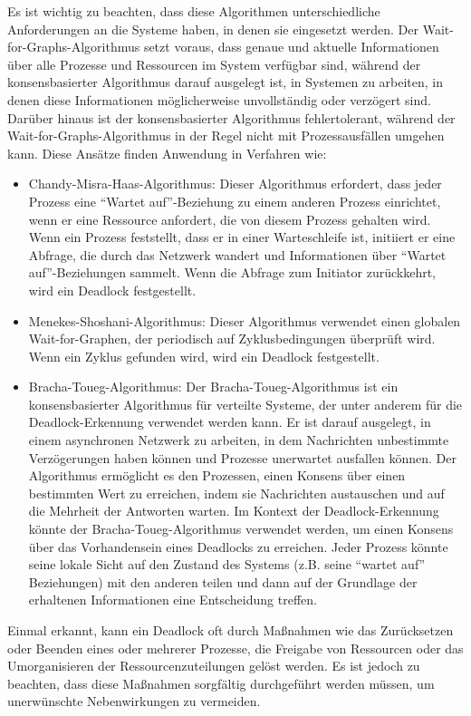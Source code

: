 Es ist wichtig zu beachten, dass diese Algorithmen unterschiedliche Anforderungen an die Systeme haben, in denen sie eingesetzt werden. Der Wait-for-Graphs-Algorithmus setzt voraus, dass genaue und aktuelle Informationen über alle Prozesse und Ressourcen im System verfügbar sind, während der konsensbasierter Algorithmus darauf ausgelegt ist, in Systemen zu arbeiten, in denen diese Informationen möglicherweise unvollständig oder verzögert sind. Darüber hinaus ist der konsensbasierter Algorithmus fehlertolerant, während der Wait-for-Graphs-Algorithmus in der Regel nicht mit Prozessausfällen umgehen kann.	Diese Ansätze finden Anwendung in Verfahren wie:

\begin{itemize}
\item Chandy-Misra-Haas-Algorithmus: Dieser Algorithmus erfordert, dass jeder Prozess eine \enquote{Wartet auf}-Beziehung zu einem anderen Prozess einrichtet, wenn er eine Ressource anfordert, die von diesem Prozess gehalten wird. Wenn ein Prozess feststellt, dass er in einer Warteschleife ist, initiiert er eine Abfrage, die durch das Netzwerk wandert und Informationen über \enquote{Wartet auf}-Beziehungen sammelt. Wenn die Abfrage zum Initiator zurückkehrt, wird ein Deadlock festgestellt.
\item Menekes-Shoshani-Algorithmus: Dieser Algorithmus verwendet einen globalen Wait-for-Graphen, der periodisch auf Zyklusbedingungen überprüft wird. Wenn ein Zyklus gefunden wird, wird ein Deadlock festgestellt.
\item Bracha-Toueg-Algorithmus: Der Bracha-Toueg-Algorithmus ist ein konsensbasierter Algorithmus für verteilte Systeme, der unter anderem für die Deadlock-Erkennung verwendet werden kann. Er ist darauf ausgelegt, in einem asynchronen Netzwerk zu arbeiten, in dem Nachrichten unbestimmte Verzögerungen haben können und Prozesse unerwartet ausfallen können. Der Algorithmus ermöglicht es den Prozessen, einen Konsens über einen bestimmten Wert zu erreichen, indem sie Nachrichten austauschen und auf die Mehrheit der Antworten warten. Im Kontext der Deadlock-Erkennung könnte der Bracha-Toueg-Algorithmus verwendet werden, um einen Konsens über das Vorhandensein eines Deadlocks zu erreichen. Jeder Prozess könnte seine lokale Sicht auf den Zustand des Systems (z.B. seine \enquote{wartet auf} Beziehungen) mit den anderen teilen und dann auf der Grundlage der erhaltenen Informationen eine Entscheidung treffen.
\end{itemize}
Einmal erkannt, kann ein Deadlock oft durch Maßnahmen wie das Zurücksetzen oder Beenden eines oder mehrerer Prozesse, die Freigabe von Ressourcen oder das Umorganisieren der Ressourcenzuteilungen gelöst werden. Es ist jedoch zu beachten, dass diese Maßnahmen sorgfältig durchgeführt werden müssen, um unerwünschte Nebenwirkungen zu vermeiden.

